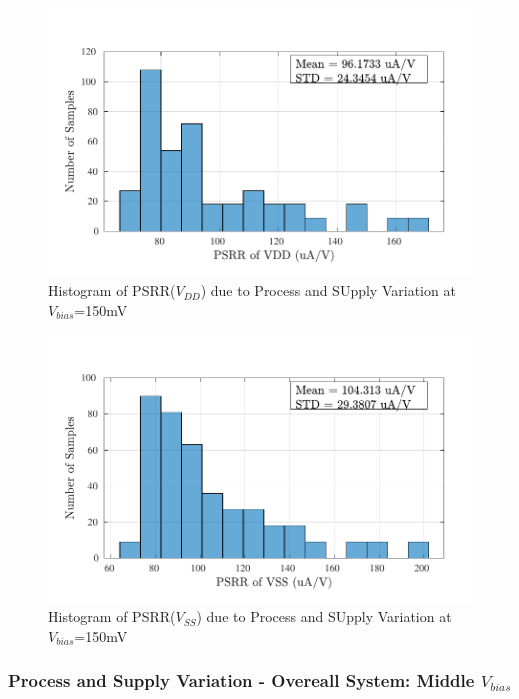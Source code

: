 \begin{figure} [H]
\centering
\includegraphics[scale=1]{Figures/Corners/Overall/PV_Min/PDFs/PV_Min_psrrp.pdf}
\caption{Histogram of PSRR($V_{DD}$) due to Process and SUpply Variation at $V_{bias}$=150mV}
\end{figure}

\begin{figure} [H]
\centering
\includegraphics[scale=1]{Figures/Corners/Overall/PV_Min/PDFs/PV_Min_psrrn.pdf}
\caption{Histogram of PSRR($V_{SS}$) due to Process and SUpply Variation at $V_{bias}$=150mV}
\end{figure}

\subsubsection{Process and Supply Variation - Overeall System: Middle $V_{bias}$}

